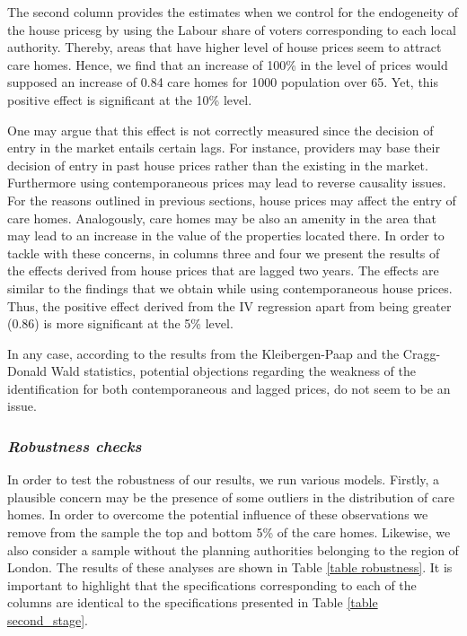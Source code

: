\documentclass[12pt,letterpaper]{article}
\begin{document}
The second column provides the estimates when we control for the endogeneity of the house pricesg by using
the Labour share of voters corresponding to each local authority.  Thereby, areas that have higher level of house prices
seem to attract care homes.  Hence, we find  that an increase 
of 100\% in the level of prices would supposed an increase of 0.84 care homes 
for 1000 population over 65.  Yet, this positive effect is significant at the 10\% level. 

One may argue that this effect is not correctly measured since the decision of 
entry in the market entails certain lags. For instance, providers may base their decision of entry in past house prices rather
than the existing in the market. Furthermore using contemporaneous prices may 
lead to  reverse causality issues. For the reasons outlined in previous sections, house prices may affect the entry of care 
homes. Analogously, care homes may be also an amenity in the area that may 
lead to an increase in the value of the properties located there. In order to 
tackle with these concerns, in columns three and four we present the results of the effects 
derived from house prices that are lagged two years. The effects are similar to 
the findings that we obtain while using contemporaneous house prices. Thus, the positive effect derived from the IV 
regression apart from being greater (0.86) is more significant at the 5\% 
level.

In any case, according to the results from the Kleibergen-Paap and the Cragg-Donald Wald 
statistics, potential objections regarding the weakness of the identification for both contemporaneous and lagged prices, do not seem to 
be an issue.  


\subsubsection*{\normalsize{\it Robustness checks}}
 
In order to test the robustness of our results, we run various models.
 Firstly, a plausible concern may be the presence of some outliers in
  the distribution of care homes. In order to overcome the potential influence 
  of these observations we remove from the sample the top and bottom 5\%  of the care homes.
 Likewise, we also consider a sample without the planning authorities belonging to the region of London.
   The results of these analyses are shown in Table \ref{table robustness}. It is important to highlight that the specifications 
   corresponding to each of the columns are identical to the specifications presented in Table 
   \ref{table second_stage}.
 
\end{document}
